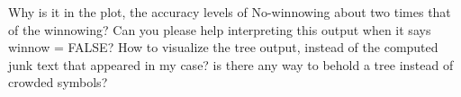 \documentclass[caret-main.tex]{subfiles}
\begin{document}
Why is it in the plot, the accuracy levels of No-winnowing about two times that of the winnowing? Can you please help interpreting this output when it says winnow = FALSE?
How to visualize the tree output, instead of the computed junk text that appeared in my case? is there any way to behold a tree instead of crowded symbols?
\end{document}
